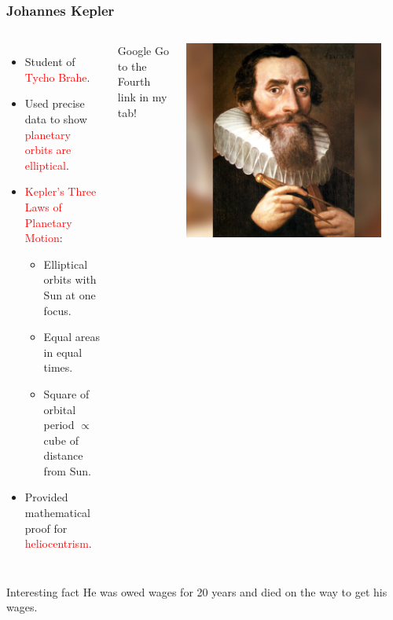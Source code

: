 \documentclass[aspectratio=1611, 9pt]{beamer}
\begin{document}
\begin{frame}
  \frametitle{Johannes Kepler}
  \begin{columns}
    \begin{itemize}
      \item Student of \textcolor{red}{Tycho Brahe}.
      \item Used precise data to show \textcolor{red}{planetary orbits are elliptical}.
      \item \textcolor{red}{Kepler's Three Laws of Planetary Motion}:
      \begin{itemize}
        \item Elliptical orbits with Sun at one focus.
        \item Equal areas in equal times.
        \item Square of orbital period $\propto$ cube of distance from Sun.
      \end{itemize}
      \item Provided mathematical proof for \textcolor{red}{heliocentrism}.
    \end{itemize}
    \begin{block}{Google}
      Go to the Fourth link in my tab!
    \end{block}

    \begin{center}
      \includegraphics[width=0.9\textwidth]{pictures/kepler.jpg}
    \end{center}
  \end{columns}
  \begin{alertblock}{Interesting fact}
    He was owed wages for 20 years and died on the way to get his wages.
  \end{alertblock}
\end{frame}
\end{document}

